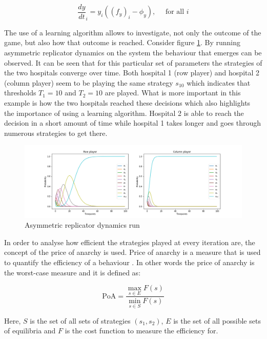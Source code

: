 \begin{equation}
    \frac{dy}{dt}_i = y_i((f_y)_i - \phi_y), \quad \text{ for all }i
\end{equation}

The use of a learning algorithm allows to investigate, not only the outcome of 
the game, but also how that outcome is reached.
Consider figure \ref{fig:ard-by-itself}. 
By running asymmetric replicator dynamics on the system the behaviour that 
emerges can be observed.
It can be seen that for this particular set of parameters the strategies of 
the two hospitals converge over time. 
Both hospital 1 (row player) and hospital 2 (column player) seem to be playing 
the same strategy \(s_{10}\) which indicates that thresholds \(T_1 = 10\) and 
\(T_2 = 10\) are played.
What is more important in this example is how the two hospitals reached these
decisions which also highlights the importance of using a learning algorithm.
Hospital 2 is able to reach the decision in a short amount of time while 
hospital 1 takes longer and goes through numerous strategies to get there.

\begin{figure}[H]
    \centering
    \includegraphics[scale=0.4, trim=120 0 120 0]{imgs/asymmetric_rd/asymmetric_rd.png}
    \caption{Asymmetric replicator dynamics run}
    \label{fig:ard-by-itself}
\end{figure}

In order to analyse how efficient the strategies played at every iteration are, 
the concept of the price of anarchy is used.
Price of anarchy is a measure that is used to quantify the efficiency of a
behaviour \cite{roughgarden2005selfish}.
In other words the price of anarchy is the worst-case measure and it is
defined as:

\begin{equation}\label{eq:general_price_of_anarchy}
    \text{PoA} = \frac{\max_{s \in E} F(s)}{\min_{s \in S} F(s)}
\end{equation}

Here, \(S\) is the set of all sets of strategies \((s_1, s_2)\), \(E\) is the 
set of all possible sets of equilibria and \(F\) is the cost function to 
measure the efficiency for. 

